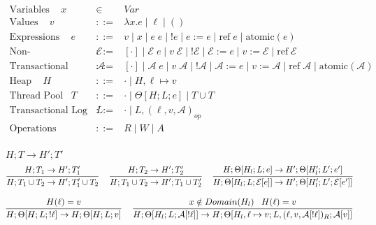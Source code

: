 \documentclass[9pt]{article}
\newcommand{\aeval}[1]{\mathcal{A}[#1]}
\newcommand{\actxt}[0]{\mathcal{A}}
\newcommand{\eval}[1]{\mathcal{E}[#1]}
\newcommand{\ctxt}[0]{\mathcal{E}}
\newcommand{\loc}[0]{\ell}
\newcommand{\atomic}[1]{\text{atomic}(#1)}
\newcommand{\alloc}[1]{\text{ref} \; #1}
\begin{document}
\begin{displaymath}
\begin{array}{rcll}
\text{Variables } \;\;\; x &\in& Var \\
\text{Values } \;\;\; v &::=& \lambda x. e \; | \; \loc \; | \; () \\
\text{Expressions } \;\;\; e &::=& v \; | \; x \; | \; e \; e \; | \; !e \; | \; e := e \; | \; \alloc{e} \; | \; \atomic{e}\\
\text{Non-Transactional Context } \;\;\; \ctxt &::=& [\cdot] \; | \; \ctxt \; e \; | \; v \; \ctxt \; | \; ! \ctxt \; | \; \ctxt := e \; | \; v := \ctxt \; | \; \alloc{\ctxt}\\
\text{Transactional Context } \;\;\; \actxt &::=& [\cdot] \; | \; \actxt \; e \; | \; v \; \actxt \; | \; ! \actxt \; | \; \actxt := e \; | \; v := \actxt \; | \; \alloc{\actxt} \; | \; \atomic{\actxt} \\
\text{Heap } \;\;\; H &::=& \cdot \; | \; H, \loc \mapsto v \\
\text{Thread Pool} \;\;\; T &::=& \cdot \; | \; \Theta[H; L; e] \; | \; T \cup T \\
\text{Transactional Log } \;\;\; L &::=& \cdot \; | \; L, (\loc, v, \actxt)_{op} \\
\text{Operations } \;\;\; &::=& R \; | \; W \; | \; A \\
\end{array}
\end{displaymath}


$\boxed{H; T \rightarrow H' ;T'}$
\[
\infer[]{H; T_1 \cup T_2 \rightarrow H'; T_1' \cup T_2}{H; T_1 \rightarrow H'; T_1'} \;\;\;
\infer[]{H; T_1 \cup T_2 \rightarrow H'; T_1 \cup T_2'}{H; T_2 \rightarrow H'; T_2'} \;\;\; 
\infer[]{H; \Theta[H_l; L; \eval{e}] \rightarrow H'; \Theta[H_l'; L'; \eval{e'}]}{H; \Theta[H_l; L; e] \rightarrow H'; \Theta[H_l'; L'; e']}
\]

\[
\infer[]{H; \Theta[H; L; !\loc] \rightarrow H; \Theta[H; L; v]}{H(\loc) = v} \;\;\;
\infer[]{H; \Theta[H_l; L; \aeval{!\loc}] \rightarrow H; \Theta[H_l, \loc \mapsto v; L, (\loc, v, \aeval{!\loc})_R; \aeval{v}]}{x \notin Domain(H_l) \;\;\; H(\loc) = v } 
\]
\end{document}
